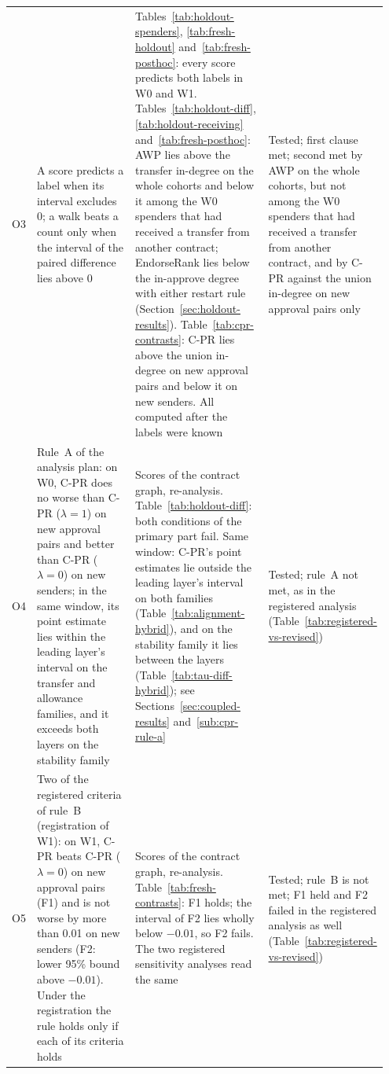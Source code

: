 {\begin{longtable}{@{}>{\raggedright\arraybackslash}p{0.05\linewidth}>{\raggedright\arraybackslash}p{0.34\linewidth}>{\raggedright\arraybackslash}p{0.39\linewidth}>{\raggedright\arraybackslash}p{0.17\linewidth}@{}}
O3 & A score predicts a label when its interval excludes $0$; a walk beats a count only when the interval of the paired difference lies above $0$ & Tables~\ref{tab:holdout-spenders}, \ref{tab:fresh-holdout} and~\ref{tab:fresh-posthoc}: every score predicts both labels in W0 and W1. Tables~\ref{tab:holdout-diff}, \ref{tab:holdout-receiving} and~\ref{tab:fresh-posthoc}: AWP lies above the transfer in-degree on the whole cohorts and below it among the W0 spenders that had received a transfer from another contract; EndorseRank lies below the in-approve degree with either restart rule (Section~\ref{sec:holdout-results}). Table~\ref{tab:cpr-contrasts}: \mbox{C-PR} lies above the union in-degree on new approval pairs and below it on new senders. All computed after the labels were known & Tested; first clause met; second met by AWP on the whole cohorts, but not among the W0 spenders that had received a transfer from another contract, and by \mbox{C-PR} against the union in-degree on new approval pairs only \\
\addlinespace
O4 & Rule~A of the analysis plan: on W0, \mbox{C-PR} does no worse than \mbox{C-PR} ($\lambda=1$) on new approval pairs and better than \mbox{C-PR} ($\lambda=0$) on new senders; in the same window, its point estimate lies within the leading layer's interval on the transfer and allowance families, and it exceeds both layers on the stability family & Scores of the contract graph, re-analysis. Table~\ref{tab:holdout-diff}: both conditions of the primary part fail. Same window: \mbox{C-PR}'s point estimates lie outside the leading layer's interval on both families (Table~\ref{tab:alignment-hybrid}), and on the stability family it lies between the layers (Table~\ref{tab:tau-diff-hybrid}); see Sections~\ref{sec:coupled-results} and~\ref{sub:cpr-rule-a} & Tested; rule~A not met, as in the registered analysis (Table~\ref{tab:registered-vs-revised}) \\
\addlinespace
O5 & Two of the registered criteria of rule~B (registration of W1): on W1, \mbox{C-PR} beats \mbox{C-PR} ($\lambda=0$) on new approval pairs (F1) and is not worse by more than 0.01 on new senders (F2: lower 95\% bound above $-0.01$). Under the registration the rule holds only if each of its criteria holds & Scores of the contract graph, re-analysis. Table~\ref{tab:fresh-contrasts}: F1 holds; the interval of F2 lies wholly below $-0.01$, so F2 fails. The two registered sensitivity analyses read the same & Tested; rule~B is not met; F1 held and F2 failed in the registered analysis as well (Table~\ref{tab:registered-vs-revised}) \\
\end{longtable}
}

